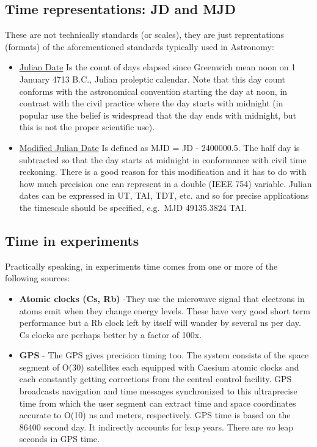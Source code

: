 \documentclass[
  letterpaper,
  DIV=11,
  numbers=noendperiod]{scrreprt}
\begin{document}
\subsection{Time representations: JD and
MJD}\label{time-representations-jd-and-mjd}

These are not technically standards (or scales), they are just
reprentations (formats) of the aforementioned standards typically used
in Astronomy:

\begin{itemize}
\item
  \href{http://en.wikipedia.org/wiki/Julian_day}{Julian Date} Is the
  count of days elapsed since Greenwich mean noon on 1 January 4713
  B.C., Julian proleptic calendar. Note that this day count conforms
  with the astronomical convention starting the day at noon, in contrast
  with the civil practice where the day starts with midnight (in popular
  use the belief is widespread that the day ends with midnight, but this
  is not the proper scientific use).
\item
  \href{http://en.wikipedia.org/wiki/Julian_day}{Modified Julian Date}
  Is defined as MJD = JD - 2400000.5. The half day is subtracted so that
  the day starts at midnight in conformance with civil time reckoning.
  There is a good reason for this modification and it has to do with how
  much precision one can represent in a double (IEEE 754) variable.
  Julian dates can be expressed in UT, TAI, TDT, etc. and so for precise
  applications the timescale should be specified, e.g.~MJD 49135.3824
  TAI.
\end{itemize}

\subsection{Time in experiments}\label{time-in-experiments}

Practically speaking, in experiments time comes from one or more of the
following sources:

\begin{itemize}
\item
  \textbf{Atomic clocks (Cs, Rb)} -They use the microwave signal that
  electrons in atoms emit when they change energy levels. These have
  very good short term performance but a Rb clock left by itself will
  wander by several ns per day. Cs clocks are perhaps better by a factor
  of 100x.
\item
  \textbf{GPS} - The GPS gives precision timing too. The system consists
  of the space segment of O(30) satellites each equipped with Caesium
  atomic clocks and each constantly getting corrections from the central
  control facility. GPS broadcasts navigation and time messages
  synchronized to this ultraprecise time from which the user segment can
  extract time and space coordinates accurate to O(10) ns and meters,
  respectively. GPS time is based on the 86400 second day. It indirectly
  accounts for leap years. There are \emph{no} leap seconds in GPS time.
\end{itemize}
\end{document}
